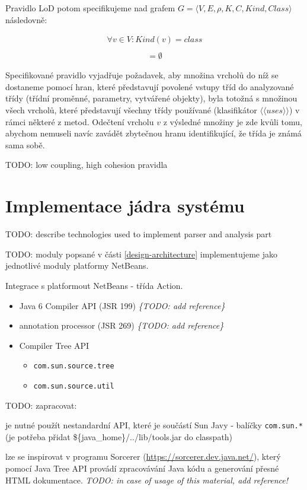 Pravidlo LoD potom specifikujeme nad grafem $G = \langle V, E, \rho, K, C, \mathit{Kind}, \mathit{Class}\rangle$ následovně:

\begin{align*}
\forall v \in V: Kind(v) = class\\
\end{align*}
\begin{align*}
[((&F(G, v, class, \langle\langle{}has\_field\rangle\rangle{}) \cup F(G, v, class, \langle\langle{}has\_param\rangle\rangle{}) \cup\\
&F(G, v, class, \langle\langle{}instantiates\rangle\rangle{})) \cap F(v, class, \langle\langle{}uses\rangle\rangle{}) \setminus v] = \emptyset
\end{align*}

Specifikované pravidlo vyjadřuje požadavek, aby množina vrcholů do níž se dostaneme pomocí hran, které představují povolené vstupy tříd do analyzované třídy (třídní proměnné, parametry, vytvářené objekty), byla totožná s množinou všech vrcholů, které představují všechny třídy používané (klasifikátor $\langle\langle{}uses\rangle\rangle$) v rámci některé z metod. Odečtení vrcholu $v$ z výsledné množiny je zde kvůli tomu, abychom nemuseli navíc zavádět zbytečnou hranu identifikující, že třída je známá sama sobě.

TODO: low coupling, high cohesion pravidla

\section{Implementace jádra systému}
TODO: describe technologies used to implement parser and analysis part

TODO: moduly popsané v části \ref{design-architecture} implementujeme jako jednotlivé moduly platformy NetBeans.

Integrace s platformout NetBeans - třída Action.

\begin{itemize}
\item Java 6 Compiler API (JSR 199) \emph{\{TODO: add reference\}}
\item annotation processor (JSR 269) \emph{\{TODO: add reference\}}
\item Compiler Tree API
  \begin{itemize}
  \item \verb+com.sun.source.tree+ 
  \item \verb+com.sun.source.util+
  \end{itemize}
\end{itemize}

TODO: zapracovat:

je nutné použít nestandardní API, které je součástí Sun Javy - balíčky \verb+com.sun.*+ (je potřeba přidat \$\{java\_home\}/../lib/tools.jar do classpath)

lze se inspirovat v programu Sorcerer (\href{https://sorcerer.dev.java.net/}{https://sorcerer.dev.java.net/}), který pomocí Java Tree API provádí zpracovávání Java kódu a generování přesné HTML dokumentace. \emph{TODO: in case of usage of this material, add reference!}
